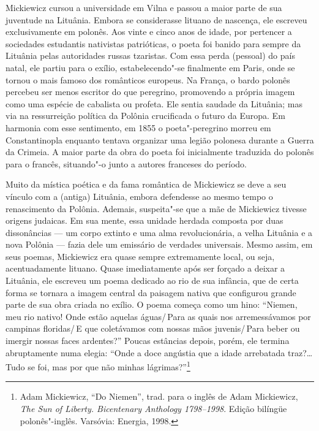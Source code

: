 Mickiewicz cursou a universidade em Vilna e passou a maior parte de sua
juventude na Lituânia. Embora se considerasse lituano de nascença, ele
escreveu exclusivamente em polonês. Aos vinte e cinco anos de idade, por
pertencer a sociedades estudantis nativistas patrióticas, o poeta foi
banido para sempre da Lituânia pelas autoridades russas tzaristas. Com
essa perda (pessoal) do país natal, ele partiu para o exílio,
estabelecendo"-se finalmente em Paris, onde se tornou o mais famoso dos
românticos europeus. Na França, o bardo polonês percebeu ser menos
escritor do que peregrino, promovendo a própria imagem como uma espécie
de cabalista ou profeta. Ele sentia saudade da Lituânia; mas via na
ressurreição política da Polônia crucificada o futuro da Europa. Em
harmonia com esse sentimento, em 1855 o poeta"-peregrino morreu em
Constantinopla enquanto tentava organizar uma legião polonesa durante a
Guerra da Crimeia. A maior parte da obra do poeta foi inicialmente
traduzida do polonês para o francês, situando"-o junto a autores
franceses do período.

Muito da mística poética e da fama romântica de Mickiewicz se deve a seu
vínculo com a (antiga) Lituânia, embora defendesse ao mesmo tempo o
renascimento da Polônia. Ademais, suspeita"-se que a mãe de Mickiewicz
tivesse origens judaicas. Em sua mente, essa unidade herdada composta
por duas dissonâncias --- um corpo extinto e uma alma revolucionária, a
velha Lituânia e a nova Polônia --- fazia dele um emissário de verdades
universais. Mesmo assim, em seus poemas, Mickiewicz era quase sempre
extremamente local, ou seja, acentuadamente lituano. Quase imediatamente
após ser forçado a deixar a Lituânia, ele escreveu um poema dedicado ao
rio de sua infância, que de certa forma se tornara a imagem central da
paisagem nativa que configurou grande parte de sua obra criada no
exílio. O poema começa como um hino: ``Niemen, meu rio nativo! Onde
estão aquelas águas/\,Para as quais nos arremessávamos por campinas
floridas/\,E que coletávamos com nossas mãos juvenis/\,Para beber ou
imergir nossas faces ardentes?'' Poucas estâncias depois, porém, ele
termina abruptamente numa elegia: ``Onde a doce angústia que a idade
arrebatada traz?\ldots{} Tudo se foi, mas por que não minhas
lágrimas?''\footnote{Adam Mickiewicz, ``Do Niemen'', trad. para o
  inglês de Adam Mickiewicz, \textit{The Sun of Liberty. Bicentenary
  Anthology 1798--1998}. Edição bilíngüe polonês"-inglês. Varsóvia:
  Energia, 1998.}

